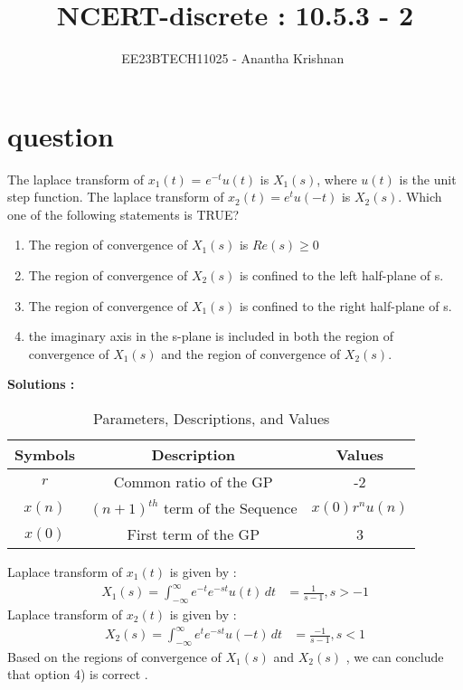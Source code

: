 \documentclass[journal,12pt,onecolumn]{IEEEtran}
\theoremstyle{remark}
\begin{document}

\vspace{3cm}

\title{NCERT-discrete : 10.5.3 - 2}
\author{EE23BTECH11025 - Anantha Krishnan $^{}$%
}
\maketitle
\bigskip



\section{question}

The laplace transform of $x_1(t)$ = $e^{-t}u(t)$ is $X_1(s)$, where $u(t)$ is the unit step function. The laplace transform of $x_2(t) = e^tu(-t)$ is $X_2(s)$. Which one of the following statements is TRUE?
\begin{enumerate}
    \item The region of convergence of $X_1(s)$ is $Re(s) \geq 0$
    \item The region of convergence of $X_2(s)$ is confined to the left half-plane of s.
    \item The region of convergence of $X_1(s)$ is confined to the right half-plane of s.
    \item the imaginary axis in the s-plane is included in both the region of convergence of $X_1(s)$ and the region of convergence of $X_2(s)$.
\end{enumerate}
 



\textbf{Solutions :}
\begin{table}[ht!]
\centering
\begin{tabular}{ |c|c|c| } 
 \hline
Symbols & Description & Values  \\
\hline
 $r$ & Common ratio of the GP & -2\\
 \hline
 $x(n)$ & $(n+1)^{th}$ term of the Sequence & $x(0)r^{n}u(n)$\\
 \hline
 $x(0)$ & First term of the GP & 3\\
\hline
\end{tabular}
\caption{Parameters, Descriptions, and Values}
\label{table:ee25-tab3}
\end{table}

Laplace transform of $x_1(t)$ is given by :
\begin{align}
    X_1(s) =  \int_{-\infty}^{\infty} e^{-t}e^{-st}u(t) \,dt
&= \frac{1}{s-1} , s > -1
\end{align}
Laplace transform of $x_2(t)$ is given by :
\begin{align}
    X_2(s) =  \int_{-\infty}^{\infty} e^{t}e^{-st}u(-t) \,dt
&= \frac{-1}{s-1} , s < 1
\end{align}
Based on the regions of convergence of  $X_1(s)$ and $X_2(s)$ , we can conclude that option 4) is correct .  
\end{document}
